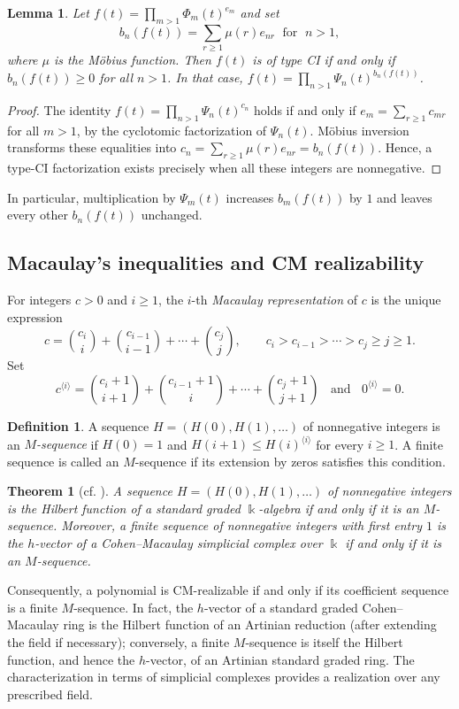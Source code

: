 \documentclass[11pt,a4paper]{amsart}
\newtheorem{theorem}{Theorem}[section]
\newtheorem{lemma}[lemma]{Lemma}
\theoremstyle{definition}
\newtheorem{definition}[definition]{Definition}
\theoremstyle{remark}
\newcommand{\kk}{\Bbbk}
\begin{document}
\begin{lemma}\label{lem:mobius-ci}
Let $f(t)=\prod_{m>1}\Phi_m(t)^{e_m}$ and set \[b_n(f(t))=\sum_{r\ge1}\mu(r)e_{nr} \;\text{ for }\; n>1,\] where $\mu$ is the M\"obius function.
Then $f(t)$ is of type CI if and only if $b_n(f(t))\ge0$ for all $n>1$. In that case, $f(t)=\prod_{n>1}\Psi_n(t)^{b_n(f(t))}$.
\end{lemma}
\begin{proof}
The identity $f(t)=\prod_{n>1}\Psi_n(t)^{c_n}$ holds if and only if $e_m=\sum_{r\ge1}c_{mr}$ for all $m>1$, by the cyclotomic factorization of $\Psi_n(t)$. M\"obius inversion transforms these equalities into $c_n=\sum_{r\ge1}\mu(r)e_{nr}=b_n(f(t))$. Hence, a type-CI factorization exists precisely when all these integers are nonnegative.
\end{proof}
In particular, multiplication by $\Psi_m(t)$ increases $b_m(f(t))$ by $1$ and leaves every other $b_n(f(t))$ unchanged.

\subsection{Macaulay's inequalities and CM realizability}\label{sec:M}
For integers $c>0$ and $i\ge1$, the $i$-th \emph{Macaulay representation} of $c$ is the unique expression
\[c=\binom{c_i}{i}+\binom{c_{i-1}}{i-1}+\cdots+\binom{c_j}{j},\qquad c_i>c_{i-1}>\cdots>c_j\ge j\ge1.\]
Set \[c^{\langle i\rangle}=\binom{c_i+1}{i+1}+\binom{c_{i-1}+1}{i}+\cdots+\binom{c_j+1}{j+1}\;\;\text{ and }\;\; 0^{\langle i\rangle}=0.\]

\begin{definition}
A sequence $H=(H(0),H(1),\ldots)$ of nonnegative integers is an \emph{$M$-sequence} if $H(0)=1$ and $H(i+1)\le H(i)^{\langle i\rangle}$ for every $i\ge1$. A finite sequence is called an $M$-sequence if its extension by zeros satisfies this condition.
\end{definition}

\begin{theorem}[{cf. \cite[Theorems~4.2.10 and~5.1.15]{BrunsHerzog}}]\label{thm:macaulay}
A sequence $H=(H(0),H(1),\ldots)$ of nonnegative integers is the Hilbert function of a standard graded $\kk$-algebra if and only if it is an $M$-sequence. Moreover, a finite sequence of nonnegative integers with first entry $1$ is the $h$-vector of a Cohen--Macaulay simplicial complex over $\kk$ if and only if it is an $M$-sequence.
\end{theorem}
Consequently, a polynomial is CM-realizable if and only if its coefficient sequence is a finite $M$-sequence. In fact, the $h$-vector of a standard graded Cohen--Macaulay ring is the Hilbert function of an Artinian reduction (after extending the field if necessary); conversely, a finite $M$-sequence is itself the Hilbert function, and hence the $h$-vector, of an Artinian standard graded ring. The characterization in terms of simplicial complexes provides a realization over any prescribed field.
\end{document}

